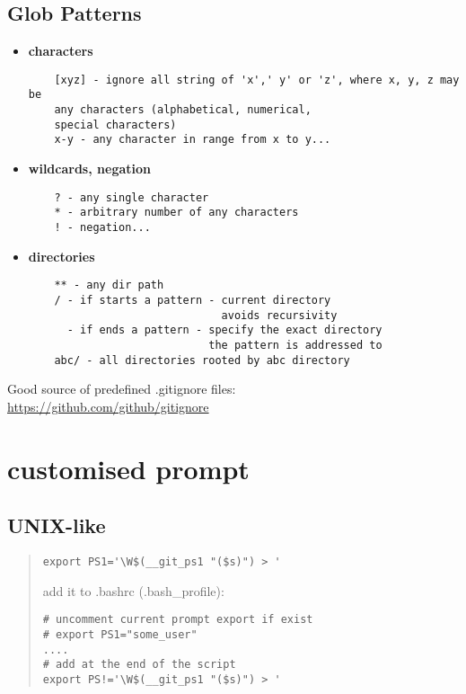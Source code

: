 \documentclass{report}
\begin{document}
\subsection{Glob Patterns}
\begin{itemize}
	\item \textbf{characters}
	\begin{verbatim}
	[xyz] - ignore all string of 'x',' y' or 'z', where x, y, z may be 
	any characters (alphabetical, numerical,
	special characters)
	x-y - any character in range from x to y...
	\end{verbatim}
	
	\item \textbf{wildcards, negation}
	\begin{verbatim}
	? - any single character
	* - arbitrary number of any characters
	! - negation...
	\end{verbatim}
	
	\item \textbf{directories}
	\begin{verbatim}
	** - any dir path
	/ - if starts a pattern - current directory
	                          avoids recursivity
	  - if ends a pattern - specify the exact directory 
	                        the pattern is addressed to
	abc/ - all directories rooted by abc directory
	\end{verbatim}
\end{itemize}
Good source of predefined .gitignore files:\\
\url{https://github.com/github/gitignore}


\section{customised prompt}
\subsection*{UNIX-like}
\begin{quote}
\begin{verbatim}
export PS1='\W$(__git_ps1 "($s)") > '
\end{verbatim}
add it to .bashrc (.bash\_profile):
\begin{lstlisting}
# uncomment current prompt export if exist
# export PS1="some_user"
....
# add at the end of the script
export PS!='\W$(__git_ps1 "($s)") > '

\end{lstlisting}
\end{quote}
\end{document}
